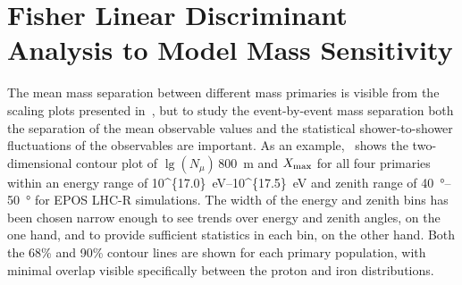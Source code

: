 






\section{Fisher Linear Discriminant Analysis to Model Mass Sensitivity}\label{sec:fisher}
The mean mass separation between different mass primaries is visible from the scaling plots presented in~, but to study the event-by-event mass separation both the separation of the mean observable values and the statistical shower-to-shower fluctuations of the observables are important.
As an example,~ shows the two-dimensional contour plot of $\lg\left(N_{\mu}\right)$\,\qty{800}{\meter} and $X_{\rm max}$ for all four primaries within an energy range of \qtyrange[parse-numbers=false]{10^{17.0}}{10^{17.5}}{\electronvolt} and zenith range of \qtyrange{40}{50}{\degree} for EPOS LHC-R simulations.
The width of the energy and zenith bins has been chosen narrow enough to see trends over energy and zenith angles, on the one hand, and to provide sufficient statistics in each bin, on the other hand.
Both the 68\% and 90\% contour lines are shown for each primary population, with minimal overlap visible specifically between the proton and iron distributions.

